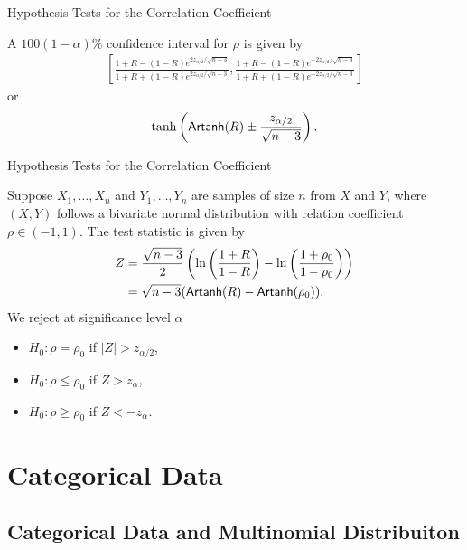 \begin{frame}{Hypothesis Tests for the Correlation Coefficient}

\justifying
{} A $100(1-\alpha)\%$ confidence interval for $\rho$ is given by
\begin{align*}
\left[\frac{1+R-(1-R)e^{2z_{\alpha/2}/\sqrt{n-3}}}{1+R+(1-R)e^{2z_{\alpha/2}/\sqrt{n-3}}},  \frac{1+R-(1-R)e^{-2z_{\alpha/2}/\sqrt{n-3}}}{1+R+(1-R)e^{-2z_{\alpha/2}/\sqrt{n-3}}}\right]
\end{align*}
or
\begin{align*}
\tanh\left(\mathsf{Artanh}(R) \pm \frac{z_{\alpha/2}}{\sqrt{n-3}} \right).
\end{align*}


\end{frame}


\begin{frame}{Hypothesis Tests for the Correlation Coefficient}

\justifying
{} Suppose $X_1, \ldots, X_n$ and $Y_1, \ldots, Y_n$ are samples of size $n$ from $X$ and $Y$, where $(X, Y)$ follows a bivariate normal distribution with relation coefficient $\rho\in (-1, 1)$. The test statistic is given by
\begin{align*}
Z & = \frac{\sqrt{n-3}}{2}\left(\ln\left(\frac{1+R}{1-R} \right) - \ln\left(\frac{1+\rho_0}{1-\rho_0} \right) \right) \\
& = \sqrt{n-3}(\mathsf{Artanh}(R) - \mathsf{Artanh}(\rho_0)).
\end{align*}
We reject at significance level $\alpha$
\begin{itemize}
	\item $H_0: \rho = \rho_0$ if $|Z| > z_{\alpha/2}$,
	\item $H_0: \rho \leq \rho_0$ if $Z > z_{\alpha}$,
	\item $H_0: \rho \geq \rho_0$ if $Z < -z_{\alpha}$.
\end{itemize}


\end{frame}


\section{Categorical Data}


\subsection{Categorical Data and Multinomial Distribuiton}

